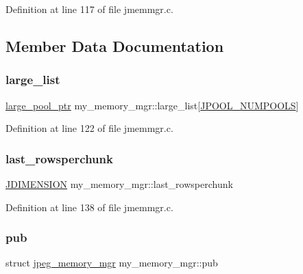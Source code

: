 Definition at line 117 of file jmemmgr.\+c.



\subsection{Member Data Documentation}
\mbox{\label{structmy__memory__mgr_af8257908eac43538230773374417739b}} 
\subsubsection{\texorpdfstring{large\_list}{large\_list}}
{\footnotesize\ttfamily \mbox{\hyperlink{jmemmgr_8c_a048418eab2b2022aaa4ec587c48a3089}{large\+\_\+pool\+\_\+ptr}} my\+\_\+memory\+\_\+mgr\+::large\+\_\+list\mbox{[}\mbox{\hyperlink{jpeglib_8h_a21147e3031a409bcc8d1ddfa5b2c53b5}{J\+P\+O\+O\+L\+\_\+\+N\+U\+M\+P\+O\+O\+LS}}\mbox{]}}



Definition at line 122 of file jmemmgr.\+c.

\mbox{\label{structmy__memory__mgr_a7e30eb574b588f102f07d0ddb94d177d}} 
\subsubsection{\texorpdfstring{last\_rowsperchunk}{last\_rowsperchunk}}
{\footnotesize\ttfamily \mbox{\hyperlink{jmorecfg_8h_a04ed4674f6f1d0d50ec241531e38274f}{J\+D\+I\+M\+E\+N\+S\+I\+ON}} my\+\_\+memory\+\_\+mgr\+::last\+\_\+rowsperchunk}



Definition at line 138 of file jmemmgr.\+c.

\mbox{\label{structmy__memory__mgr_a692dd77bfba8ab81c4f42643254d4528}} 
\subsubsection{\texorpdfstring{pub}{pub}}
{\footnotesize\ttfamily struct \mbox{\hyperlink{structjpeg__memory__mgr}{jpeg\+\_\+memory\+\_\+mgr}} my\+\_\+memory\+\_\+mgr\+::pub}




